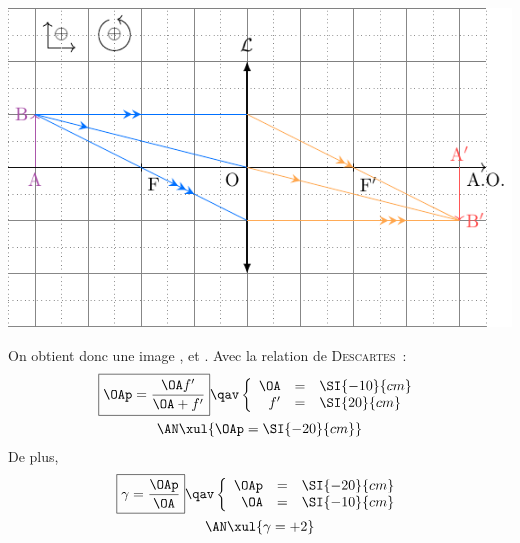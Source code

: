 \documentclass[a4paper, 10pt, garamond, oneside]{book}
\begin{document}
{\begin{enumerate}
\begin{minipage}[t]{.48\linewidth}
\begin{center}
				      \includegraphics[width=\linewidth]{convAF}
			      \end{center}
		      \end{minipage}
		      \noindent
		      \begin{minipage}[t]{.48\linewidth}
			      On obtient donc une image ,  et
			      . Avec la relation de \textsc{Descartes}~:
			      \begin{gather*}
				      \boxed{\OAp = \frac{\OA f'}{\OA+f'}}
				      \qav
				      \left\{
				      \begin{array}{rcl}
					      \OA & = & \SI{-10}{cm}
					      \\
					      f'  & = & \SI{20}{cm}
				      \end{array}
				      \right.\\
				      \AN
				      \xul{
					      \OAp = \SI{-20}{cm}
				      }
			      \end{gather*}
			      De plus,
			      \begin{gather*}
				      \boxed{\gamma = \frac{\OAp}{\OA}}
				      \qav
				      \left\{
				      \begin{array}{rcl}
					      \OAp & = & \SI{-20}{cm}
					      \\
					      \OA  & = & \SI{-10}{cm}
				      \end{array}
				      \right.\\
				      \AN
				      \xul{
					      \gamma = +2
				      }
			      \end{gather*}
		      \end{minipage}
		      \hfill
		      \begin{minipage}[t]{.48\linewidth}
			      ~
			      \begin{center}

\end{center}
\end{minipage}
\end{enumerate}}
\end{document}

